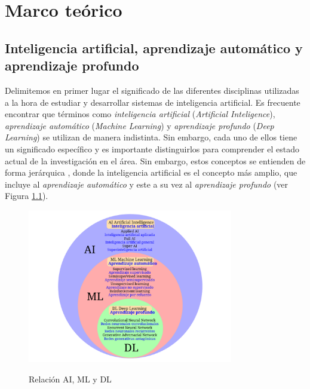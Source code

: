 \chapter{Marco teórico}

\section{Inteligencia artificial, aprendizaje automático y aprendizaje profundo}

Delimitemos en primer lugar el significado de las diferentes disciplinas utilizadas a la hora de estudiar y desarrollar sistemas de inteligencia artificial. Es frecuente encontrar que términos como \textit{inteligencia artificial} (\textit{Artificial Inteligence}), \textit{aprendizaje automático} (\textit{Machine Learning}) y \textit{aprendizaje profundo} (\textit{Deep Learning}) se utilizan de manera indistinta. Sin embargo, cada uno de ellos tiene un significado específico y es importante distinguirlos para comprender el estado actual de la investigación en el área. Sin embargo, estos conceptos se entienden de forma jerárquica \citep{torresivinalsPythonDeepLearning2020}, donde la inteligencia artificial es el concepto más amplio, que incluye al \textit{aprendizaje automático} y este a su vez al \textit{aprendizaje profundo} (ver Figura \ref{fig:ai_ml_dl}).


\begin{figure}[]
    \caption{Relación AI, ML y DL}
    \centering
    \includegraphics[width=0.8\textwidth]{./figuras/Tipos_Inteligencia_Artificial.png}
    \label{fig:ai_ml_dl}
\end{figure}


